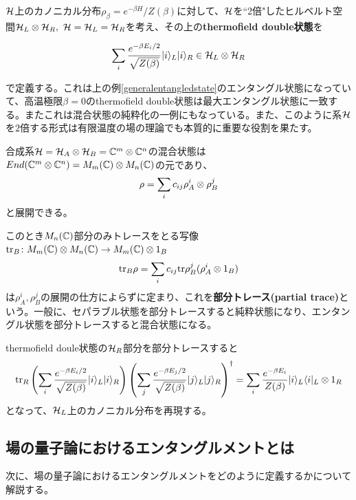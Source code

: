 \begin{ex}
$\mathcal{H}$上のカノニカル分布$\rho_\beta=e^{-\beta H}/Z(\beta)$に対して、$\mathcal{H}$を``2倍"したヒルベルト空間$\HH_L\tensor \HH_R,\ \HH=\HH_L=\HH_R$を考え、その上の\textbf{thermofield double状態}を
\begin{oframed}
\begin{align}
\sum_{i} \frac{e^{-\beta E_i/2}}{\sqrt{Z(\beta)}}|i\rangle_L |i\rangle_R \in \mathcal{H}_L\otimes\mathcal{H}_R
\end{align}
\end{oframed}
で定義する。これは上の例\ref{generalentangledstate}のエンタングル状態になっていて、高温極限$\beta=0$のthermofield double状態は最大エンタングル状態に一致する。またこれは混合状態の純粋化の一例にもなっている。また、このように系$\mathcal{H}$を$2$倍する形式は有限温度の場の理論でも本質的に重要な役割を果たす。
\end{ex}

合成系$\mathcal{H}=\mathcal{H}_A\otimes \mathcal{H}_B=\mathbb{C}^m\otimes\mathbb{C}^n$の混合状態は$End(\mathbb{C}^m\otimes\mathbb{C}^n)=M_m(\mathbb{C})\otimes M_n(\mathbb{C})$の元であり、
\begin{align}
\rho=\sum_{i} c_{ij} \rho_A^i \otimes \rho_B^j
\end{align}
と展開できる。

このとき$M_n(\mathbb{C})$部分のみトレースをとる写像$\textnormal{tr}_B\colon M_m(\mathbb{C})\otimes M_n(\mathbb{C})\to M_m(\mathbb{C})\otimes 1_B$
\begin{align}
\textnormal{tr}_B \rho=\sum_{i} c_{ij}\textnormal{tr}\rho_B^j (\rho_A^i \otimes 1_B)
\end{align}
は$\rho_A^i,\rho_B^j$の展開の仕方によらずに定まり、これを\textbf{部分トレース(partial trace)}という。一般に、セパラブル状態を部分トレースすると純粋状態になり、エンタングル状態を部分トレースすると混合状態になる。

\begin{ex}\label{tfdpartialtrace}
thermofield doule状態の$\mathcal{H}_R$部分を部分トレースすると
\begin{align}
\textnormal{tr}_R \left(\sum_{i}\frac{e^{-\beta E_i/2}}{\sqrt{Z(\beta)}}|i\rangle_L |i\rangle_R\right)\left(\sum_{j}\frac{e^{-\beta E_j/2}}{\sqrt{Z(\beta)}}|j\rangle_L |j\rangle_R\right)^\dagger=\sum_{i}\frac{e^{-\beta E_i}}{Z(\beta)}|i\rangle_L\langle i|_L\otimes 1_R
\end{align}
となって、$\mathcal{H}_L$上のカノニカル分布を再現する。
\end{ex}

\subsection{場の量子論におけるエンタングルメントとは}
次に、場の量子論におけるエンタングルメントをどのように定義するかについて解説する。

